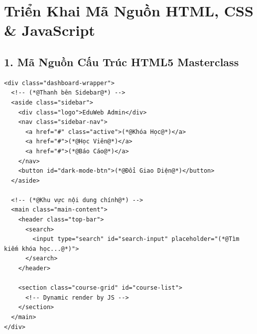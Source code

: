 \section{Triển Khai Mã Nguồn HTML, CSS \& JavaScript}

\subsection{1. Mã Nguồn Cấu Trúc HTML5 Masterclass}

\begin{codeWindow}
\begin{lstlisting}[language=HTML5]
<div class="dashboard-wrapper">
  <!-- (*@Thanh bên Sidebar@*) -->
  <aside class="sidebar">
    <div class="logo">EduWeb Admin</div>
    <nav class="sidebar-nav">
      <a href="#" class="active">(*@Khóa Học@*)</a>
      <a href="#">(*@Học Viên@*)</a>
      <a href="#">(*@Báo Cáo@*)</a>
    </nav>
    <button id="dark-mode-btn">(*@Đổi Giao Diện@*)</button>
  </aside>

  <!-- (*@Khu vực nội dung chính@*) -->
  <main class="main-content">
    <header class="top-bar">
      <search>
        <input type="search" id="search-input" placeholder="(*@Tìm kiếm khóa học...@*)">
      </search>
    </header>

    <section class="course-grid" id="course-list">
      <!-- Dynamic render by JS -->
    </section>
  </main>
</div>
\end{lstlisting}
\end{codeWindow}

